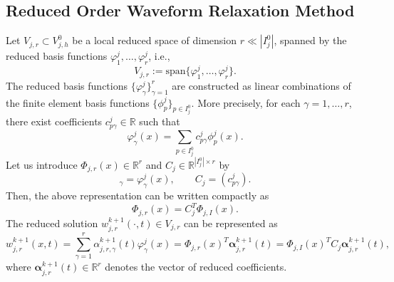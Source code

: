 \documentclass[a4paper, 11pt]{article}
\theoremstyle{remark}
\begin{document}
\subsection{Reduced Order Waveform Relaxation Method}
Let $V_{j, r}\subset V^{0}_{j, h}$ be a local reduced space of dimension $r \ll |I^{0}_{j}|$, spanned by the reduced basis functions $\varphi^{j}_{1}, \ldots, \varphi^{j}_{r}$, i.e.,
\begin{equation*}
    V_{j, r} := \text{span}\{\varphi^{j}_{1}, \ldots, \varphi^{j}_{r}\}.
\end{equation*}
The reduced basis functions $\{\varphi^{j}_{\gamma}\}_{\gamma = 1}^{r}$ are constructed as linear combinations of the finite element basis functions $\{\phi^{j}_{p}\}_{p \in I^{0}_{j}}$. More precisely, for each $\gamma = 1, \ldots, r$, there exist coefficients $c^{j}_{p\gamma} \in \mathbb{R}$ such that
\begin{equation*}
    \varphi^{j}_{\gamma}(x) = \sum_{p \in I^{0}_{j}} c^{j}_{p\gamma}\phi^{j}_{p}(x).
\end{equation*}
Let us introduce $\Phi_{j, r}(x)\in \mathbb{R}^{r}$ and $C_{j}\in \mathbb{R}^{|I_{j}^{0}|\times r}$ by
\begin{equation*}
    [\Phi_{j, r}(x)]_{\gamma} = \varphi^{j}_{\gamma}(x), \qquad C_{j} = (c^{j}_{p\gamma}).
\end{equation*}
Then, the above representation can be written compactly as
\begin{equation*}
    \Phi_{j, r}(x) = C_{j}^{T}\Phi_{j, I}(x).
\end{equation*}
The reduced solution $w^{k+1}_{j, r}(\cdot, t)\in V_{j, r}$ can be represented as
\begin{equation*}
    w^{k+1}_{j, r}(x, t) = \sum_{\gamma = 1}^{r}\alpha_{j, r, \gamma}^{k+1}(t)\varphi^{j}_{\gamma}(x) = \Phi_{j, r}(x)^{T}\boldsymbol{\alpha}_{j, r}^{k+1}(t) = \Phi_{j, I}(x)^{T}C_{j}\boldsymbol{\alpha}_{j, r}^{k+1}(t),
\end{equation*}
where $\boldsymbol{\alpha}^{k+1}_{j, r}(t) \in \mathbb{R}^{r}$ denotes the vector of reduced coefficients.
\end{document}
